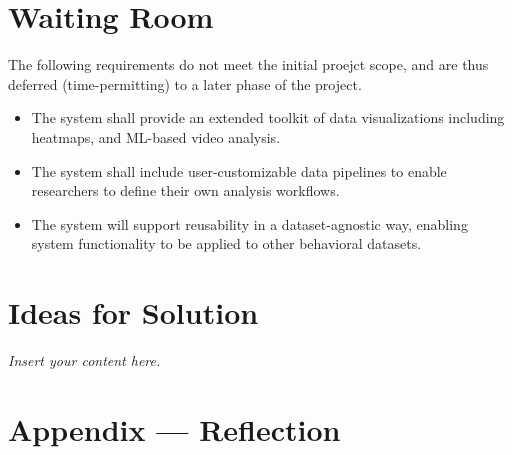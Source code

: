 \documentclass[12pt]{article}
\newcommand{\lips}{\textit{Insert your content here.}}
\begin{document}
\section{Waiting Room}

\par{The following requirements do not meet the initial proejct scope, and are thus deferred (time-permitting) to a later phase of the project. }

\begin{itemize}
    \item The system shall provide an extended toolkit of data visualizations including heatmaps, and ML-based video analysis.
    \item The system shall include user-customizable data pipelines to enable researchers to define their own analysis workflows.
    \item The system will support reusability in a dataset-agnostic way, enabling system functionality to be applied to other behavioral datasets.
\end{itemize}


\section{Ideas for Solution}
\lips

\newpage{}
\section*{Appendix --- Reflection}




\end{document}
